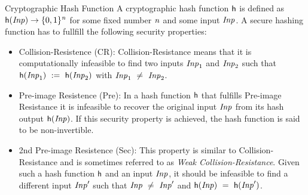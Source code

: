 \begin{definition}{Cryptographic Hash Function}\label{def:hashFunction}
    A cryptographic hash function $\mathsf{h}$ is defined as $\mathsf{h} (\mathit{Inp}) \rightarrow \{0,1\}^{\mathit{n}}$ for some fixed number $\mathit{n}$ and some input $\mathit{Inp}$. A secure hashing function
    has to fullfill the following security properties:~\cite{al2011cryptographic}
    \begin{itemize}
        \item Collision-Resistence (CR): Collision-Resistance means that it is computationally infeasible to find two inputs $\mathit{Inp}_1$ and $\mathit{Inp}_2$ such that
        $\mathsf{h} (\mathit{Inp}_1) ~:=~ \mathsf{h} (\mathit{Inp}_2)$ with $\mathit{Inp}_1 ~\neq~ \mathit{Inp}_2$.
        \item Pre-image Resistence (Pre): In a hash function $\mathsf{h}$ that fulfills Pre-image Resistance it is infeasible to recover the original input $\mathit{Inp}$ from its hash output $\mathsf{h} (\mathit{Inp})$.
        If this security property is achieved, the hash function is said to be non-invertible.
        \item 2nd Pre-image Resistence (Sec):  This property is similar to Collision-Resistance and is sometimes referred to as \textit{Weak Collision-Resistance}.
        Given such a hash function $\mathsf{h}$ and an input $\mathit{Inp}$, it should be infeasible to find a different input $\mathit{Inp}'$ such that $\mathit{Inp} ~\neq~ \mathit{Inp}'$
        and $\mathsf{h} (\mathit{Inp}) ~=~ \mathsf{h} (\mathit{Inp}')$.
    \end{itemize}
\end{definition}


